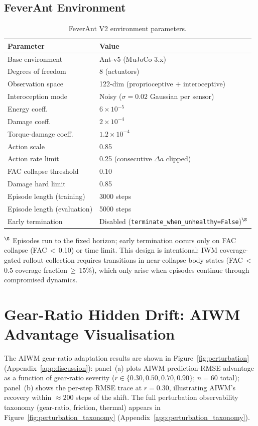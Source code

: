 \documentclass{article}
\begin{document}
{\vspace{-4pt}
\subsection*{FeverAnt Environment}
\vspace{-4pt}
\begin{table}[H]
\centering
\caption{FeverAnt V2 environment parameters.}
\begin{tabular}{ll}
\toprule
Parameter & Value \\
\midrule
Base environment & Ant-v5 (MuJoCo 3.x) \\
Degrees of freedom & 8 (actuators) \\
Observation space & 122-dim (proprioceptive $+$ interoceptive) \\
Interoception mode & Noisy ($\sigma \!=\! 0.02$ Gaussian per sensor) \\
Energy coeff.\ & $6 \times 10^{-5}$ \\
Damage coeff.\ & $2 \times 10^{-4}$ \\
Torque-damage coeff.\ & $1.2 \times 10^{-4}$ \\
Action scale & 0.85 \\
Action rate limit & 0.25 (consecutive $\Delta a$ clipped) \\
FAC collapse threshold & 0.10 \\
Damage hard limit & 0.85 \\
Episode length (training) & 3000 steps \\
Episode length (evaluation) & 5000 steps \\
Early termination & Disabled (\texttt{terminate\_when\_unhealthy=False})$^\S$ \\
\bottomrule
\end{tabular}

\begin{minipage}{\linewidth}\raggedright\footnotesize
$^\S$ Episodes run to the fixed horizon; early termination occurs only on FAC collapse (FAC\,$<$\,0.10) or time limit.
This design is intentional: IWM coverage-gated rollout collection requires transitions in near-collapse body states (FAC\,$<$\,0.5 coverage fraction\,$\geq$\,15\%), which only arise when episodes continue through compromised dynamics.
\end{minipage}
\end{table}

\section{Gear-Ratio Hidden Drift: AIWM Advantage Visualisation}
\label{app:gear_ratio}
The AIWM gear-ratio adaptation results are shown in Figure~\ref{fig:perturbation} (Appendix~\ref{app:discussion}): panel~(a) plots AIWM prediction-RMSE advantage as a function of gear-ratio severity ($r\in\{0.30,0.50,0.70,0.90\}$; $n\!=\!60$ total); panel~(b) shows the per-step RMSE trace at $r\!=\!0.30$, illustrating AIWM's recovery within ${\approx}200$ steps of the shift. The full perturbation observability taxonomy (gear-ratio, friction, thermal) appears in Figure~\ref{fig:perturbation_taxonomy} (Appendix~\ref{app:perturbation_taxonomy}).

}
\end{document}
